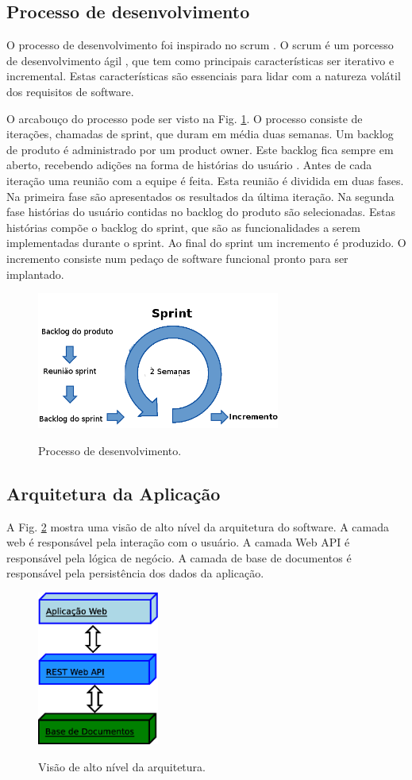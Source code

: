 \documentclass[journal]{IEEEtran}
\begin{document}
\subsection{Processo de desenvolvimento}
O processo de desenvolvimento foi inspirado no scrum \cite{Schwaber2001}.
O scrum é um porcesso de desenvolvimento ágil \cite{Beck2001}, que tem como
principais características ser iterativo e incremental. Estas características
são essenciais para lidar com a natureza volátil dos requisitos de software.

O arcabouço do processo pode ser visto na Fig. \ref{dev_proc}. O processo
consiste de iterações, chamadas de sprint, que duram em média duas
semanas. Um backlog de produto é administrado por um product owner. 
Este backlog fica sempre em aberto, recebendo adições na forma de
histórias do usuário \cite{cohn2004}. Antes de cada iteração uma reunião
com a equipe é feita. Esta reunião é dividida em duas fases. Na primeira
fase são apresentados os resultados da última iteração. Na segunda fase
histórias do usuário contidas no backlog do produto são selecionadas.
Estas histórias compõe o backlog do sprint, que são as funcionalidades a serem implementadas
durante o sprint. Ao final do sprint
um incremento é produzido. O incremento consiste num pedaço de software
funcional pronto para ser implantado.

\begin{figure}[!t]
	\centering
	{\includegraphics[width=8cm]{scrum_projeto}}
	\caption{Processo de desenvolvimento.}
	\label{dev_proc}
\end{figure}


\subsection{Arquitetura da Aplicação}
A Fig. \ref{camadas} mostra uma visão de alto nível da
arquitetura do software. A camada web é responsável pela interação com o usuário. 
A camada Web API  é responsável pela lógica de negócio. 
A camada de base de documentos é responsável pela
persistência dos dados da aplicação.
\begin{figure}[!t]
	\centering
	{\includegraphics[width=4cm]{camadas}}
	\caption{Visão de alto nível da arquitetura.}
	\label{camadas}
\end{figure}
\end{document}

